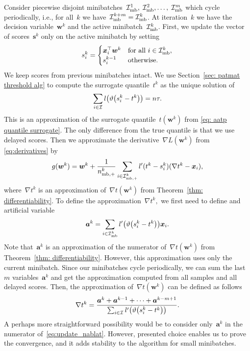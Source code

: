 Consider piecewise disjoint minibatches~$\mathcal{I}_{\text{mb}}^1, \; \mathcal{I}_{\text{mb}}^2, \ldots, \; \mathcal{I}_{\text{mb}}^m$ which cycle periodically, i.e., for all~$k$ we have~$\mathcal{I}_{\text{mb}}^{k+m} = \mathcal{I}_{\text{mb}}^k$. At iteration~$k$ we have the decision variable~$\bm{w}^k$ and the active minibatch~$\mathcal{I}_{\text{mb}}^k$. First, we update the vector of scores~$\bm{s}^k$ only on the active minibatch by setting
\begin{equation}\label{eq:defin_z}
  s_i^k = \begin{cases}
    \bm{x}_i^\top \bm{w}^k & \text{for all } i \in \mathcal{I}_{\text{mb}}^k, \\
    s_i^{k-1} & \text{otherwise.}
  \end{cases} 
\end{equation}
We keep scores from previous minibatches intact. We use Section~\ref{sec: patmat threshold alg} to compute the surrogate quantile~$t^k$ as the unique solution of
\begin{equation}\label{eq:update_t}
  \sum_{i \in \I}l\Brac{\vartheta\Brac{s_i^k - t^k}} = n\tau.
\end{equation}
This is an approximation of the surrogate quantile~$t(\bm{w}^k)$ from \eqref{eq: aatp quantile surrogate}. The only difference from the true quantile is that we use delayed scores. Then we approximate the derivative~$\nabla L(\bm{w}^k)$ from \eqref{eq:derivatives} by
\begin{equation}\label{eq:update_g}
  g(\bm{w}^k)
    = \bm{w}^k + \frac{1}{n_{\text{mb},+}^k} \sum_{i \in \mathcal{I}_{\text{mb},+}^k} l'(t^k - s_i^k)(\nabla t^k - \bm{x}_i),
\end{equation}
where~$\nabla t^k$ is an approximation of~$\nabla t(\bm{w}^k)$ from Theorem~\ref{thm: differentiability}. To define the approximation~$\nabla t^k,$ we first need to define and artificial variable
\begin{equation}\label{eq:update_a}
  \bm{a}^k = \sum_{i \in \Imb^k} l'\Brac{\vartheta\Brac{s_i^k - t^k}}\bm{x}_i.
\end{equation}
Note that~$\bm{a}^k$ is an approximation of the numerator of~$\nabla t(\bm{w}^k)$ from Theorem~\ref{thm: differentiability}. However, this approximation uses only the current minibatch. Since our minibatches cycle periodically, we can sum the last $m$ variables~$\bm{a}^k$ and get the approximation computed from all samples and all delayed scores. Then, the approximation of~$\nabla t(\bm{w}^k)$ can be defined as follows
\begin{equation}\label{eq:update_nablat}
  \nabla t^k
    = \frac{\bm{a}^k + \bm{a}^{k-1} + \dots + \bm{a}^{k - m + 1}}{\sum_{i \in \I} l'\Brac{\vartheta\Brac{s_i^k - t^k}}}.
\end{equation}
A perhaps more straightforward possibility would be to consider only~$\bm{a}^k$ in the numerator of~\eqref{eq:update_nablat}. However, presented choice enables us to prove the convergence, and it adds stability to the algorithm for small minibatches.

